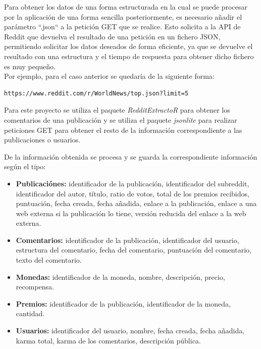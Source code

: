 \documentclass[../../main.tex]{subfiles}
\begin{document}
\vskip 0.2in

Para obtener los datos de una forma estructurada en la cual se puede procesar por la aplicación de una forma sencilla posteriormente, es necesario añadir el parámetro ``.json`` a la petición GET que se realice. Esto solicita a la API de Reddit que devuelva el resultado de una petición en un fichero JSON, permitiendo solicitar los datos deseados de forma eficiente, ya que se devuelve el resultado con una estructura y el tiempo de respuesta para obtener dicho fichero es muy pequeño. \\
Por ejemplo, para el caso anterior se quedaría de la siguiente forma:
\begin{lstlisting}
https://www.reddit.com/r/WorldNews/top.json?limit=5
\end{lstlisting}

\vskip 0.2in

Para este proyecto se utiliza el paquete \textit{RedditExtractoR} para obtener los comentarios de una publicación y se utiliza el paquete \textit{jsonlite} para realizar peticiones GET para obtener el resto de la información correspondiente a las publicaciones o usuarios.

De la información obtenida se procesa y se guarda la correspondiente información según el tipo:

\begin{itemize}
    \item \textbf{Publicaciónes:} identificador de la publicación, identificador del subreddit, identificador del autor, título, ratio de votos, total de los premios recibidos, puntuación, fecha creada, fecha añadida, enlace a la publicación, enlace a una web externa si la publicación lo tiene, versión reducida del enlace a la web externa.

    \item \textbf{Comentarios:} identificador de la publicación, identificador del usuario, estructura del comentario, fecha del comentario, puntuación del comentario, texto del comentario.

    \item \textbf{Monedas:} identificador de la moneda, nombre, descripción, precio, recompensa.

    \item \textbf{Premios:} identificador de la publicación, identificador de la moneda, cantidad.
    
    \item \textbf{Usuarios:} identificador del usuario, nombre, fecha creada, fecha añadida, karma total, karma de los comentarios, descripción pública.
\end{itemize}
\end{document}
